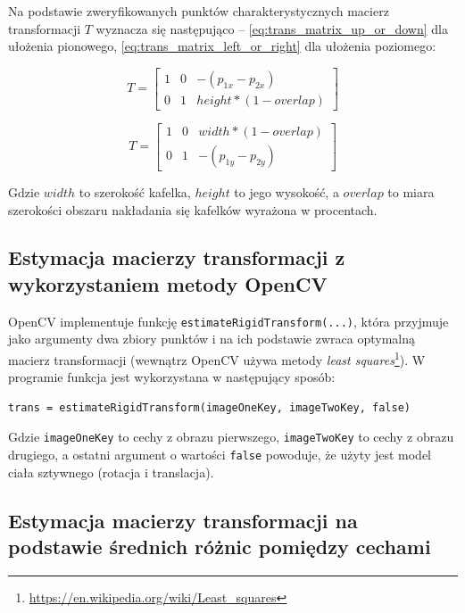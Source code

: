 Na podstawie zweryfikowanych punktów charakterystycznych macierz transformacji $T$ wyznacza się następująco -- \ref{eq:trans_matrix_up_or_down} dla ułożenia pionowego, \ref{eq:trans_matrix_left_or_right} dla ułożenia poziomego:

\begin{equation}
T = \begin{bmatrix}
  1 & 0 & -(p_{1x} - p_{2x})\\
  0 & 1 & height * (1 - overlap)
\end{bmatrix}
\label{eq:trans_matrix_up_or_down}
\end{equation}

\begin{equation}
T = \begin{bmatrix}
  1 & 0 & width * (1 - overlap) \\
  0 & 1 & -(p_{1y} - p_{2y})
\end{bmatrix}
\label{eq:trans_matrix_left_or_right}
\end{equation}

Gdzie $width$ to szerokość kafelka, $height$ to jego wysokość, a $overlap$ to miara szerokości obszaru nakładania się kafelków wyrażona w procentach.

\subsection{Estymacja macierzy transformacji z wykorzystaniem metody OpenCV}
\label{sec:proponowane_algorytmy:rigid}

OpenCV implementuje funkcję \texttt{estimateRigidTransform(...)}, która przyjmuje jako argumenty dwa zbiory punktów i na ich podstawie zwraca optymalną macierz transformacji (wewnątrz OpenCV używa metody \textit{least squares}\footnote{\url{https://en.wikipedia.org/wiki/Least_squares}}). W programie funkcja jest wykorzystana w następujący sposób:

\begin{verbatim}
trans = estimateRigidTransform(imageOneKey, imageTwoKey, false)
\end{verbatim}

Gdzie \texttt{imageOneKey} to cechy z obrazu pierwszego, \texttt{imageTwoKey} to cechy z obrazu drugiego, a ostatni argument o wartości \texttt{false} powoduje, że użyty jest model ciała sztywnego (rotacja i translacja).

\subsection{Estymacja macierzy transformacji na podstawie średnich różnic pomiędzy cechami}
\label{sec:proponowane_algorytmy:srednie_roznice}

